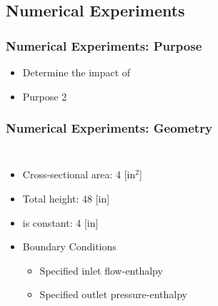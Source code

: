 \documentclass[compress,xcolor=table]{beamer}
\begin{document}
\subsection[Experiments]{Numerical Experiments}
\begin{frame}
\frametitle{Numerical Experiments: Purpose}

\begin{itemize}
\item{Determine the impact of }
\item{Purpose 2}
\end{itemize}

\end{frame}
\begin{frame}
\frametitle{Numerical Experiments: Geometry}
\begin{columns}

\begin{itemize}
\item{Cross-sectional area: 4 [in$^2$]}
\item{Total height: 48 [in]}
\item{\dx{} is constant: 4 [in]}
\item{ Boundary Conditions
	\begin{itemize}
	\item{Specified inlet flow-enthalpy}
	\item{Specified outlet pressure-enthalpy}
\end{itemize}
}
\end{itemize}

\begin{figure}[h!t]
\centering
{}
\end{figure}
\end{columns}
\end{frame}
\end{document}
